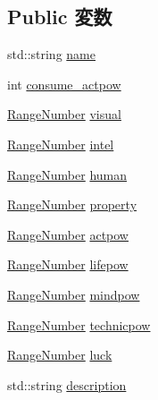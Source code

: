 \subsection*{Public 変数}
\begin{DoxyCompactItemize}
\item 
std\-::string \hyperlink{class_action_a94f19f635403e601f020ee971b5f78bf}{name}
\item 
int \hyperlink{class_action_a7cde79aa5f428c90c2c859a5c4ddb4a8}{consume\-\_\-actpow}
\item 
\hyperlink{struct_range_number}{Range\-Number} \hyperlink{class_action_a41f304752ab48d65bcb13841eb02b120}{visual}
\item 
\hyperlink{struct_range_number}{Range\-Number} \hyperlink{class_action_a509c5dae03b455a8a1313ab355656d70}{intel}
\item 
\hyperlink{struct_range_number}{Range\-Number} \hyperlink{class_action_ac57733c16cd37d7777cf299e23448f36}{human}
\item 
\hyperlink{struct_range_number}{Range\-Number} \hyperlink{class_action_ae8805db1217ff08170630a7ddab18aa0}{property}
\item 
\hyperlink{struct_range_number}{Range\-Number} \hyperlink{class_action_a0c10011bbbbc7f51698b820a3351cce9}{actpow}
\item 
\hyperlink{struct_range_number}{Range\-Number} \hyperlink{class_action_a1fe04d736e4997112de01efe94aacfae}{lifepow}
\item 
\hyperlink{struct_range_number}{Range\-Number} \hyperlink{class_action_a5b22a52083d8bc75f13acdf77cdedf20}{mindpow}
\item 
\hyperlink{struct_range_number}{Range\-Number} \hyperlink{class_action_a2a6d89f853537367a98c5d917c05fd14}{technicpow}
\item 
\hyperlink{struct_range_number}{Range\-Number} \hyperlink{class_action_a209f3f40efe10c7516902b321f43b56b}{luck}
\item 
std\-::string \hyperlink{class_action_a279273192c7d6d5f13796919bc2a79e3}{description}
\end{DoxyCompactItemize}


